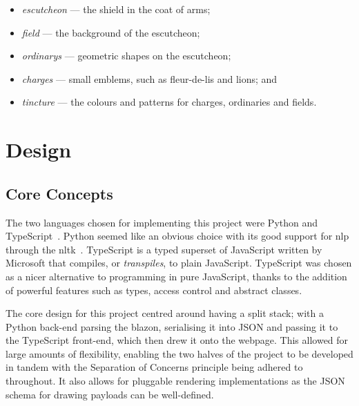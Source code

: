 \documentclass[nobib, a4paper, twoside, justified]{tufte-book}
\makeatletter
\newcommand{\charges}{\glspl{charge}\@\xspace}
\makeatother
\begin{document}
\begin{itemize}
  \item \textit{\Gls{escutcheon}} --- the shield in the coat of arms;
  \item \textit{\Gls{field}} --- the background of the escutcheon;
  \item \textit{\Glspl{ordinary}} --- geometric shapes on the escutcheon;
  \item \textit{\Glspl{charge}} --- small emblems, such as fleur-de-lis and lions; and
  \item \textit{\Gls{tincture}} --- the colours and patterns for \charges{}, ordinaries and fields.
\end{itemize}

\chapter{Design}%
\label{cha:design}

\section{Core Concepts}%
\label{sec:core_concepts}

The two languages chosen for implementing this project were Python and
TypeScript~\autocite{typescript}. Python seemed like an obvious choice with its good support for
\gls{nlp} through the \gls{nltk}~\autocite{bird2004nltk}. TypeScript is a typed superset of
JavaScript written by Microsoft that compiles, or \textit{\glspl{transpile}}, to plain JavaScript.
TypeScript was chosen as a nicer alternative to programming in pure JavaScript, thanks to the
addition of powerful features such as types, access control and abstract classes.

The core design for this project centred around having a split stack; with a Python back-end
parsing the blazon, serialising it into JSON  and passing it to the TypeScript front-end, which then drew it
onto the webpage. This allowed for large amounts of flexibility, enabling the two halves of the
project to be developed in tandem with the Separation of Concerns principle being adhered to
throughout. It also allows for pluggable rendering implementations as the JSON schema for drawing
payloads can be well-defined.
\end{document}
